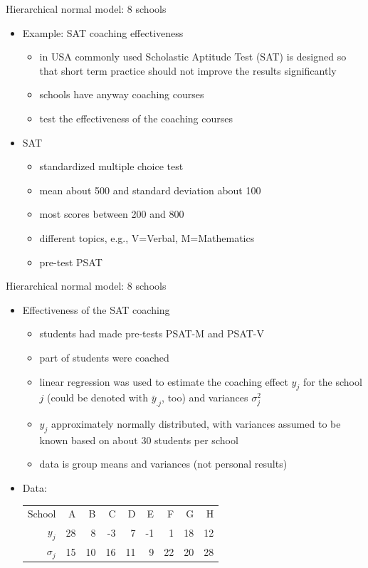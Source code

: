 \documentclass[finnish,english,t]{beamer}
\begin{document}
\begin{frame}{Hierarchical normal model: 8 schools}

  \begin{itemize}
  \item Example: SAT coaching effectiveness
    \begin{itemize}
    \item in USA commonly used Scholastic Aptitude Test (SAT) is
      designed so that short term practice should not improve the
      results significantly
    \item schools have anyway coaching courses
    \item test the effectiveness of the coaching courses 
    \end{itemize}
    \pause
  \item SAT
    \begin{itemize}
    \item standardized multiple choice test
    \item mean about 500 and standard deviation about 100
    \item most scores between 200 and 800
    \item different topics, e.g., V=Verbal, M=Mathematics
    \item pre-test PSAT
    \end{itemize}
\end{itemize}
\end{frame}

\begin{frame}{Hierarchical normal model: 8 schools}

  \begin{itemize}
  \item Effectiveness of the SAT coaching
    \begin{itemize}
    \item students had made pre-tests PSAT-M and
      PSAT-V
    \item part of students were coached
    \item linear regression was used to estimate the coaching effect
      $y_j$ for the school $j$ (could be denoted with $\bar{y}_{.j}$,
      too) and variances $\sigma_j^2$
    \item $y_j$ approximately normally distributed, with variances
      assumed to be known based on about 30 students per school
    \item data is group means and variances (not personal results)
    \end{itemize}
    \pause
  \item Data:
    {\small
    \begin{tabular}[t]{r | r r r r r r r r}
      School & A & B & C & D & E & F & G & H \\
      $y_j$ & 28 & 8 & -3 & 7 & -1 & 1 & 18 & 12 \\
      $\sigma_j$ & 15 & 10 & 16 & 11 & 9 & 22 & 20 & 28
    \end{tabular}}
  \end{itemize}
\end{frame}
\end{document}
